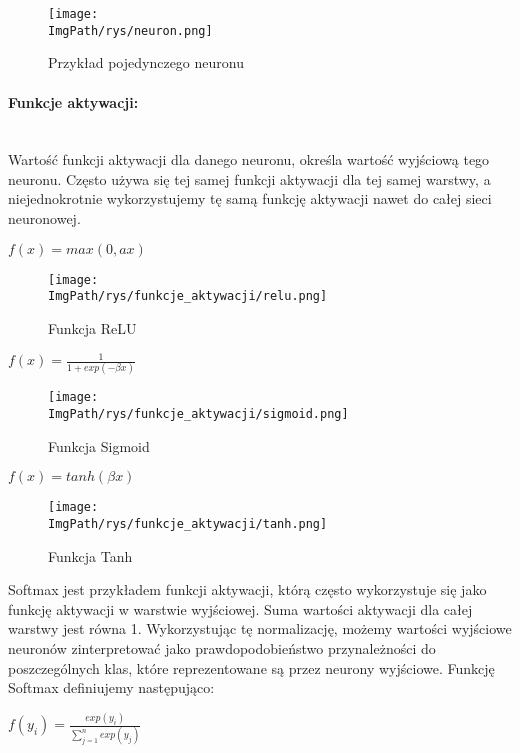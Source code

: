 \documentclass[a4paper,12pt,twoside,openany]{report}
\newcommand{\ImgPath}{.}
\begin{document}
\begin{figure}[H]	
	\centering
	\texttt{[image: \\ImgPath/rys/neuron.png]}
	
	\caption{Przykład pojedynczego neuronu}
\end{figure}

\paragraph{Funkcje aktywacji:}
\mbox{} \\ \indent
Wartość funkcji aktywacji dla danego neuronu, określa wartość wyjściową tego neuronu. Często używa się tej samej funkcji aktywacji dla tej samej warstwy, a niejednokrotnie wykorzystujemy tę samą funkcję aktywacji nawet do całej sieci neuronowej. 

\begin{center}
{\large $ f(x) = max(0, ax) $ \par}
\end{center}
\begin{figure}[H]	
	\centering
	\texttt{[image: \\ImgPath/rys/funkcje\_aktywacji/relu.png]}
	
	\caption{Funkcja ReLU}
\end{figure}

\begin{center}
{\large $ f(x) = \frac{1}{1 + exp(-\beta x)} $ \par}
\end{center}
\begin{figure}[H]	
	\centering
	\texttt{[image: \\ImgPath/rys/funkcje\_aktywacji/sigmoid.png]}
	
	\caption{Funkcja Sigmoid}
\end{figure}


\begin{center}
	{\large $ f(x) = tanh(\beta x) $ \par}
\end{center}
\begin{figure}[H]	
	\centering
	\texttt{[image: \\ImgPath/rys/funkcje\_aktywacji/tanh.png]}
	
	\caption{Funkcja Tanh}
\end{figure}

Softmax jest przykładem funkcji aktywacji, którą często wykorzystuje się jako funkcję aktywacji w warstwie wyjściowej. Suma wartości aktywacji dla całej warstwy jest równa 1. Wykorzystując tę normalizację, możemy wartości wyjściowe neuronów zinterpretować jako prawdopodobieństwo przynależności do poszczególnych klas, które reprezentowane są przez neurony wyjściowe. Funkcję Softmax definiujemy następująco: \\ 
\begin{center}
	{\LARGE $ f(y_{i}) = \frac{exp(y_{i})}
		{\sum_{j=1}^{n} exp(y_{j})}
	$\par}
\end{center}
\end{document}
